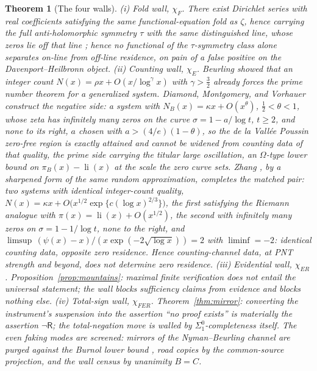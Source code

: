 \documentclass[twocolumn,10pt]{article}
\theoremstyle{plain}
\newtheorem{theorem}{Theorem}[section]
\theoremstyle{definition}
\newcommand{\R}{\mathsf{R}}
\begin{document}
\begin{theorem}[The four walls]\label{thm:walls}
\emph{(i) Fold wall, $\chi_F$.} There exist Dirichlet series with real coefficients satisfying the same functional-equation fold as $\zeta$, hence carrying the full anti-holomorphic symmetry $\tau$ with the same distinguished line, whose zeros lie off that line \cite{DavenportHeilbronn1936}; hence no functional of the $\tau$-symmetry class alone separates on-line from off-line residence, on pain of a false positive on the Davenport--Heilbronn object.
\emph{(ii) Counting wall, $\chi_E$.} Beurling \cite{Beurling1937} showed that an integer count $N(x)=\rho x+O(x/\log^{\gamma}x)$ with $\gamma>\tfrac32$ already forces the prime number theorem for a generalized system. Diamond, Montgomery, and Vorhauer \cite{DMV2006} construct the negative side: a system with $N_B(x)=\kappa x+O(x^{\theta})$, $\tfrac12<\theta<1$, whose zeta has infinitely many zeros on the curve $\sigma=1-a/\log t$, $t\ge2$, and none to its right, $a$ chosen with $a>(4/e)(1-\theta)$, so the de la Vall\'ee Poussin zero-free region is exactly attained and cannot be widened from counting data of that quality, the prime side carrying the titular large oscillation, an $\Omega$-type lower bound on $\pi_B(x)-\operatorname{li}(x)$ at the scale the zero curve sets. Zhang \cite{Zhang2007}, by a sharpened form of the same random approximation, completes the matched pair: two systems with identical integer-count quality, $N(x)=\kappa x+O\bigl(x^{1/2}\exp\{c(\log x)^{2/3}\}\bigr)$, the first satisfying the Riemann analogue with $\pi(x)=\operatorname{li}(x)+O(x^{1/2})$, the second with infinitely many zeros on $\sigma=1-1/\log t$, none to the right, and $\limsup\,(\psi(x)-x)/(x\exp(-2\sqrt{\log x}))=2$ with $\liminf=-2$: identical counting data, opposite zero residence. Hence counting-channel data, at PNT strength and beyond, does not determine zero residence.
\emph{(iii) Evidential wall, $\chi_{ER}$.} Proposition~\ref{prop:mountains}: maximal finite verification does not entail the universal statement; the wall blocks sufficiency claims from evidence and blocks nothing else.
\emph{(iv) Total-sign wall, $\chi_{FER}$.} Theorem~\ref{thm:mirror}: converting the instrument's suspension into the assertion ``no proof exists'' is materially the assertion $\neg\R$; the total-negation move is walled by $\Sigma^0_1$-completeness itself.
The even faking modes are screened: mirrors of the Nyman--Beurling channel are purged against the Burnol lower bound \cite{Nyman1950,Beurling1955,BaezDuarte2003,Burnol2002}, road copies by the common-source projection, and the wall census by unanimity $B=C$.
\end{theorem}
\end{document}
